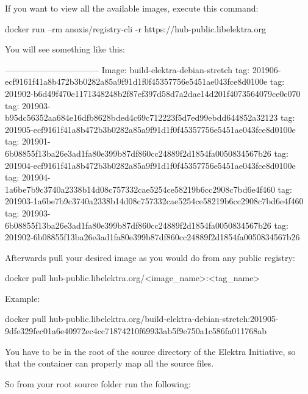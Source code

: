 If you want to view all the available images, execute this command\+:


\begin{DoxyCode}
docker run --rm anoxis/registry-cli -r https://hub-public.libelektra.org
\end{DoxyCode}


You will see something like this\+:


\begin{DoxyCode}
---------------------------------
Image: build-elektra-debian-stretch
  tag: 201906-ecf9161f41a8b472b3b0282a85a9f91d1f0f45357756e5451ae043fce8d0100e
  tag: 201902-b6d49f470e1171348248b2f87ef397d58d7a2dae14d201f4073564079ce0c070
  tag: 201903-b95dc56352aa684e16dfb8628bded4c69c712223f5d7ed99ebdd644852a32123
  tag: 201905-ecf9161f41a8b472b3b0282a85a9f91d1f0f45357756e5451ae043fce8d0100e
  tag: 201901-6b08855f13ba26e3ad1fa80e399b87df860cc24889f2d1854fa0050834567b26
  tag: 201904-ecf9161f41a8b472b3b0282a85a9f91d1f0f45357756e5451ae043fce8d0100e
  tag: 201904-1a6be7b9c3740a2338b14d08c757332cae5254ce58219b6cc2908c7bd6e4f460
  tag: 201903-1a6be7b9c3740a2338b14d08c757332cae5254ce58219b6cc2908c7bd6e4f460
  tag: 201903-6b08855f13ba26e3ad1fa80e399b87df860cc24889f2d1854fa0050834567b26
  tag: 201902-6b08855f13ba26e3ad1fa80e399b87df860cc24889f2d1854fa0050834567b26
\end{DoxyCode}


Afterwards pull your desired image as you would do from any public registry\+:


\begin{DoxyCode}
docker pull hub-public.libelektra.org/<image\_name>:<tag\_name>
\end{DoxyCode}


Example\+:


\begin{DoxyCode}
docker pull
       hub-public.libelektra.org/build-elektra-debian-stretch:201905-9dfe329fec01a6e40972ec4cc71874210f69933ab5f9e750a1c586fa011768ab
\end{DoxyCode}


You have to be in the root of the source directory of the Elektra Initiative, so that the container can properly map all the source files.

So from your root source folder run the following\+:





